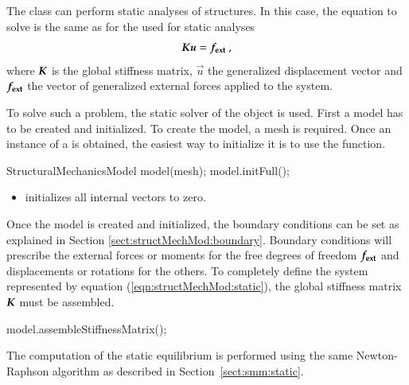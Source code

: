 The    class   can  perform  static  analyses  of
structures.  In  this case,  the  equation  to solve  is  the  same  as for  the
 used for static analyses
\begin{equation}\label{eqn:structMechMod:static}
  \boldsymbol{K} \boldsymbol{u} = \boldsymbol{f_{{\mathrm{ext}}}}~,
\end{equation}
where  $\boldsymbol{K}$ is  the  global stiffness  matrix,  $\vec{u}$ the  generalized displacement 
vector  and  $\boldsymbol{f_{{\mathrm{ext}}}}$ the  vector of generalized external  forces   applied to  the
system.


To     solve    such     a    problem,     the    static     solver     of    the
  object is used.   First a
model has to be  created and initialized.  To create the model,  a mesh is required.
Once an instance of a  is obtained, the easiest way to
initialize it is  to use the 
function.

\begin{cpp}
  StructuralMechanicsModel model(mesh);
  model.initFull();
\end{cpp}


\begin{itemize}
\item {}  initializes all internal vectors to zero.
\end{itemize}


Once the model is created and  initialized, the boundary conditions can be set as
explained   in  Section   \ref{sect:structMechMod:boundary}.   Boundary   conditions  will
prescribe   the   external   forces or moments    for   the   free   degrees   of   freedom
$\boldsymbol{f_{{\mathrm{ext}}}}$ and displacements or rotations for the others.  To completely define the
system  represented  by equation  (\ref{eqn:structMechMod:static}),  the global  stiffness
matrix            $\boldsymbol{K}$             must            be            assembled.

\begin{cpp}
  model.assembleStiffnessMatrix();
\end{cpp}

The computation of the static equilibrium is performed using the same
Newton-Raphson algorithm as described in
Section~\ref{sect:smm:static}.


